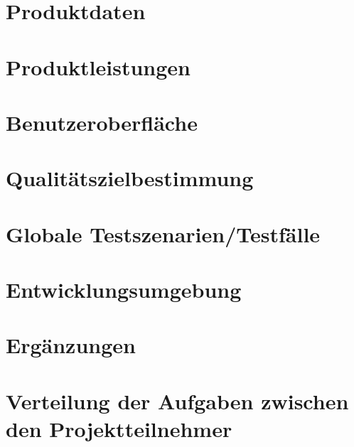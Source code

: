\documentclass[a4paper,10pt]{report}
\begin{document}
\section{Produktdaten}
\section{Produktleistungen}
\section{Benutzeroberfläche}
\section{Qualitätszielbestimmung}
\section{Globale Testszenarien/Testfälle}
\section{Entwicklungsumgebung}
\section{Ergänzungen}
\section{Verteilung der Aufgaben zwischen den Projektteilnehmer}
\end{document}
